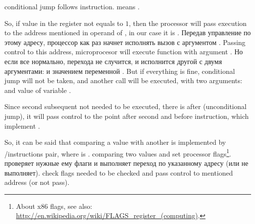 {\JNE conditional jump follows \CMP instruction. \JNE means .}

{So, if value in the \EAX register not equals to $1$, then the processor will pass execution to the 
address mentioned in operand of \JNE, in our case it is .}
\IFRU
{Передав управление по этому адресу, процессор как раз начнет исполнять вызов \printf с 
аргументом .}
{Passing control to this address, microprocesor will execute function \printf 
with argument .}
\IFRU
{Но если все нормально, перехода не случится, и исполнится другой \printf с двумя аргументами: 
 и значением переменной .}
{But if everything is fine, conditional jump will not be taken, and another \printf call 
will be executed, with two arguments:  and value of variable . }

{Since second subsequent \printf not needed to be executed, there is \JMP after (unconditional jump),
it will pass control to the point after second \printf and before  instruction, 
which implement .}

{So, it can be said that comparing a value with another is  implemented
by \CMP/\Jcc instructions pair, where  is .}
{\CMP comparing two values and set 
processor flags\footnote{About x86 flags, see also: \url{http://en.wikipedia.org/wiki/FLAGS_register_(computing)}.}.}
\IFRU
{\Jcc проверяет нужные ему флаги и выполняет переход по указанному адресу (или не выполняет).}
{\Jcc check flags needed to be checked and pass control to mentioned address (or not pass).}

